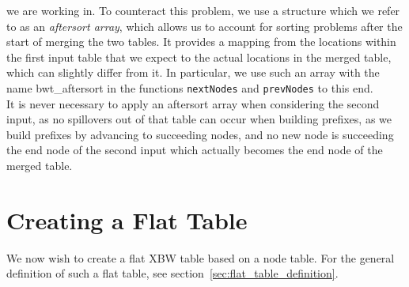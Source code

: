 \documentclass[a4paper,12pt,twoside,BCOR=10mm]{scrbook}
\begin{document}
we are working in. 
To counteract this problem, we use a structure which we refer to as an \textit{aftersort array}, 
which allows us to account for sorting problems after the start of merging the two tables. 
It provides a mapping from the locations within the first input table that we expect 
to the actual locations in the merged table, which can slightly differ from it. 
In particular, we use such an array with the name bwt\_aftersort in 
the functions \texttt{nextNodes} and \texttt{prevNodes} to this end. \\
It is never necessary to apply an aftersort array when considering the second input, 
as no spillovers out of that table can occur when building prefixes, as we build 
prefixes by advancing to succeeding nodes, and no new node is succeeding the end node 
of the second input which actually becomes the end node of the merged table.

\section{Creating a Flat Table}
%

We now wish to create a flat XBW table based on a node table. 
For the general definition of such a flat table, see section~\ref{sec:flat_table_definition}.
\end{document}
